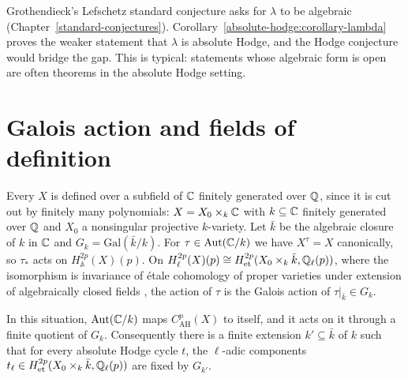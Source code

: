 \begin{remark}\label{absolute-hodge:remark-lefschetz-standard}
Grothendieck's Lefschetz standard conjecture asks for $\lambda$ to be algebraic (Chapter~\ref{standard-conjectures}). Corollary~\ref{absolute-hodge:corollary-lambda} proves the weaker statement that $\lambda$ is absolute
Hodge, and the Hodge conjecture would bridge the gap. This is typical: statements whose algebraic form is open are often theorems in the absolute Hodge setting.
\end{remark}

\section{Galois action and fields of definition}\label{absolute-hodge:section-galois}

Every $X$ is defined over a subfield of $\mathbb{C}$ finitely generated over $\mathbb{Q}$, since it is cut out by finitely many polynomials: $X = X_0 \times_k\mathbb{C}$ with $k \subseteq \mathbb{C}$ finitely generated over $\mathbb{Q}$ and $X_0$ a
nonsingular projective $k$-variety. Let $\bar k$ be the algebraic closure of $k$ in $\mathbb{C}$ and $G_k = \mathrm{Gal}(\bar k/k)$. For $\tau \in \mathrm{Aut}(\mathbb{C}/k)$ we have $X^\tau = X$ canonically, so $\tau_*$ acts on
$H^{2p}_{\mathbb{A}}(X)(p)$. On $H^{2p}_\ell(X)(p) \cong H^{2p}_{\mathrm{et}}(X_0 \times_k\bar k, \mathbb{Q}_\ell(p))$, where the isomorphism is invariance of \'etale cohomology of proper varieties under extension of
algebraically closed fields \cite[Chapter VI]{milne-etale}, the action of $\tau$ is the Galois action of $\tau|_{\bar k} \in G_k$.

\begin{proposition}\label{absolute-hodge:proposition-galois-finite}
In this situation, $\mathrm{Aut}(\mathbb{C}/k)$ maps $C^p_{\mathrm{AH}}(X)$ to itself, and it acts on it through a finite quotient of $G_k$. Consequently there is a finite extension $k' \subseteq \bar k$ of $k$ such that
for every absolute Hodge cycle $t$, the $\ell$-adic components $t_\ell \in H^{2p}_{\mathrm{et}}(X_0 \times_k\bar k, \mathbb{Q}_\ell(p))$ are fixed by $G_{k'}$.
\end{proposition}

